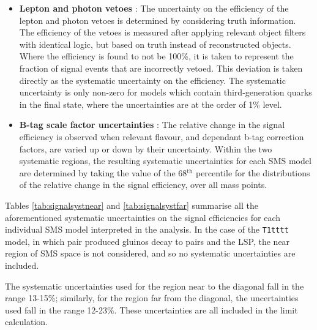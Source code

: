 \begin{itemize}
\item[]\textbf{Lepton and photon vetoes} :
The uncertainty on the efficiency of the lepton and photon vetoes is determined by considering truth information. The efficiency of the vetoes is measured after applying relevant object filters with identical logic, but based on truth instead of reconstructed objects. Where the efficiency is found to not be 100\%, it is taken to represent the fraction of signal events that are incorrectly vetoed. This deviation is taken directly as the systematic uncertainty on the efficiency. The systematic uncertainty is only non-zero for models which contain third-generation quarks in the final state, where the uncertainties are at the order of 1\% level.
\item[]\textbf{B-tag scale factor uncertainties} :
The relative change in the signal efficiency is observed when relevant flavour, \pt and \eta dependant b-tag correction factors, are varied up or down by their uncertainty. Within the two systematic regions, the resulting systematic uncertainties for each \ac{SMS} model are determined by taking the value of the 68$^{\text{th}}$ percentile for the distributions of the relative change in the signal efficiency, over all mass points.
\end{itemize}

Tables \ref{tab:signalsystnear} and \ref{tab:signalsystfar} summarise all the aforementioned systematic uncertainties on the signal efficiencies for each individual \ac{SMS} model interpreted in the analysis. In the case of the \texttt{T1tttt} model, in which pair produced gluinos decay to \ttbar pairs and the \ac{LSP}, the near region of \ac{SMS} space is not considered, and so no systematic uncertainties are included.

The systematic uncertainties used for the region near to the diagonal fall in the range 13-15\%; similarly, for the region far from the diagonal, the uncertainties used fall in the range 12-23\%. These uncertainties are all included in the limit calculation.

